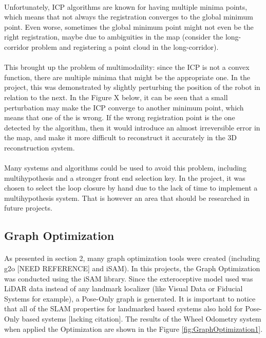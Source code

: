 \documentclass[11pt]{article}
\begin{document}
	\paragraph{}
	Unfortunately, ICP algorithms are known for having multiple minima points, which means that not always the registration converges to the global minimum point. Even worse, sometimes the global minimum point might not even be the right registration, maybe due to ambiguities in the map (consider the long-corridor problem and registering a point cloud in the long-corridor).
	
	\paragraph{}
	This brought up the problem of multimodaility: since the ICP is not a convex function, there are multiple minima that might be the appropriate one. In the project, this was demonstrated by slightly perturbing the position of the robot in relation to the next. In the Figure X below, it can be seen that a small perturbation may make the ICP converge to another minimum point, which means that one of the is wrong. If the wrong registration point is the one detected by the algorithm, then it would introduce an almost irreversible error in the map, and make it more difficult to reconstruct it accurately in the 3D reconstruction system.
	
	\paragraph{}
	Many systems and algorithms could be used to avoid this problem, including multihypothesis and a stronger front end selection key. In the project, it was chosen to select the loop closure by hand due to the lack of time to implement a multihypothesis system. That is however an area that should be researched in future projects.
	\subsection{Graph Optimization}
	\paragraph{}
	As presented in section 2, many graph optimization tools were created (including g2o [NEED REFERENCE] and iSAM). In this projects, the Graph Optimization was conducted using the iSAM library. Since the exteroceptive model used was LiDAR data instead of any landmark localizer (like Visual Data or Fiducial Systems for example), a Pose-Only graph is generated. It is important to notice that all of the SLAM properties for landmarked based systems also hold for Pose-Only based systems [lacking citation].
	The results of the Wheel Odometry system when applied the Optimization are shown in the Figure \ref{fig:GraphOptimization1}.
	
\end{document}

